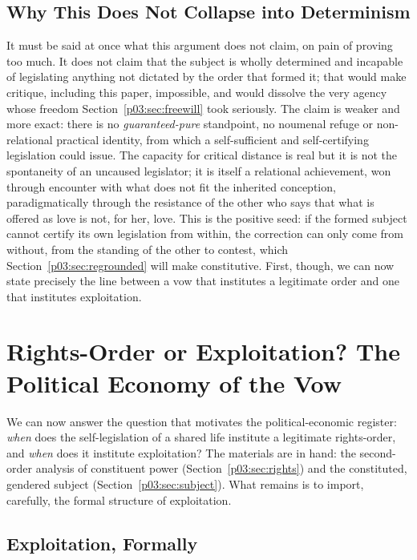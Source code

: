 \subsection{Why This Does Not Collapse into Determinism}

It must be said at once what this argument does not claim, on pain of proving too much. It does not claim that the subject is wholly determined and incapable of legislating anything not dictated by the order that formed it; that would make critique, including this paper, impossible, and would dissolve the very agency whose freedom Section~\ref{p03:sec:freewill} took seriously. The claim is weaker and more exact: there is no \emph{guaranteed-pure} standpoint, no noumenal refuge or non-relational practical identity, from which a self-sufficient and self-certifying legislation could issue. The capacity for critical distance is real but it is not the spontaneity of an uncaused legislator; it is itself a relational achievement, won through encounter with what does not fit the inherited conception, paradigmatically through the resistance of the other who says that what is offered as love is not, for her, love. This is the positive seed: if the formed subject cannot certify its own legislation from within, the correction can only come from without, from the standing of the other to contest, which Section~\ref{p03:sec:regrounded} will make constitutive. First, though, we can now state precisely the line between a vow that institutes a legitimate order and one that institutes exploitation.

\section{Rights-Order or Exploitation? The Political Economy of the Vow}\label{p03:sec:exploitation}

We can now answer the question that motivates the political-economic register: \emph{when} does the self-legislation of a shared life institute a legitimate rights-order, and \emph{when} does it institute exploitation? The materials are in hand: the second-order analysis of constituent power (Section~\ref{p03:sec:rights}) and the constituted, gendered subject (Section~\ref{p03:sec:subject}). What remains is to import, carefully, the formal structure of exploitation.

\subsection{Exploitation, Formally}

